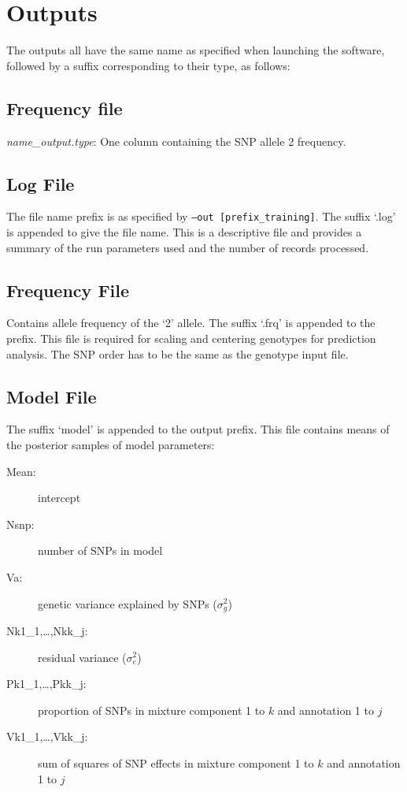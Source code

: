 \documentclass{ol-softwaremanual}
\begin{document}
 


\section{Outputs}

The outputs all have the same name as specified when launching the software, followed by a suffix corresponding to their type, as follows: 

\subsection{Frequency file}
\textit{name\_output.type}: One column containing the SNP allele 2 frequency.

\subsection{Log File}

The file name prefix is as specified by \texttt{–out [prefix\_training]}. The suffix ‘.log’ is appended to give the file name. This is a descriptive file and provides a summary of the run parameters used and the number of records processed.  

\subsection{Frequency File}

Contains allele frequency of the ‘2’ allele. The suffix ‘.frq’ is appended to the prefix. This file is required for scaling and centering genotypes for prediction analysis. The SNP order has to be the same as the genotype input file.  

\subsection{Model File}

The suffix ‘model’ is appended to the output prefix. This file contains means of the posterior samples of model parameters:
\begin{description}
\item[Mean:] intercept
\item[Nsnp:] number of SNPs in model 
\item[Va:] genetic variance explained by SNPs ($\sigma_g^2$)
\item[Nk1\_1,…,Nkk\_j:] residual variance ($\sigma_e^2$)
\item[Pk1\_1,…,Pkk\_j:] proportion of SNPs in mixture component 1 to $k$ and annotation 1 to $j$
\item[Vk1\_1,…,Vkk\_j:] sum of squares of SNP effects in mixture component 1 to $k$ and annotation 1 to $j$ 

\end{description}
\end{document}
